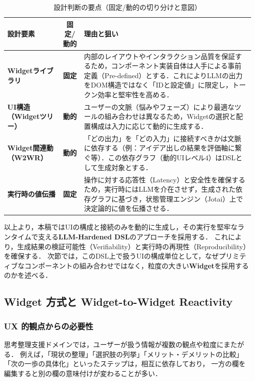 \documentclass[a4paper,10pt]{jarticle}
\begin{document}
\begin{table}[!t]
\caption{設計判断の要点（固定/動的の切り分けと意図）}
\label{tab:design_decision_beta21}
\centering
\small
\begin{tabular}{l|c|p{6.5cm}} \toprule
設計要素 & 固定/動的 & 理由と狙い \\ \midrule
\textbf{Widgetライブラリ} & \textbf{固定} &
内部のレイアウトやインタラクション品質を保証するため，コンポーネント実装自体は人手による事前定義（Pre-defined）とする．これによりLLMの出力をDOM構造ではなく「IDと設定値」に限定し，トークン効率と堅牢性を高める．\\ \hline
\textbf{UI構造（Widgetツリー）} & \textbf{動的} &
ユーザーの文脈（悩みやフェーズ）により最適なツールの組み合わせは異なるため，Widgetの選択と配置構成は入力に応じて動的に生成する．\\ \hline
\textbf{Widget間連動（W2WR）} & \textbf{動的} &
「どの出力」を「どの入力」に接続すべきかは文脈に依存する（例：アイデア出しの結果を評価軸に繋ぐ等）．この依存グラフ（動的UIレベル4）はDSLとして生成対象とする．\\ \hline
\textbf{実行時の値伝播} & \textbf{固定} &
操作に対する応答性（Latency）と安全性を確保するため，実行時にはLLMを介在させず，生成された依存グラフに基づき，状態管理エンジン（Jotai）上で決定論的に値を伝播させる．\\
\bottomrule
\end{tabular}
\end{table}

以上より，本稿ではUIの構成と接続のみを動的に生成し，その実行を堅牢なランタイムで支える\textbf{LLM-Hardened DSL}のアプローチを採用する．
これにより，生成結果の検証可能性（Verifiability）と実行時の再現性（Reproducibility）を確保する．
次節では，このDSL上で扱うUIの構成単位として，なぜプリミティブなコンポーネントの組み合わせではなく，粒度の大きい\textbf{Widget}を採用するのかを述べる．

\subsection{Widget 方式と Widget-to-Widget Reactivity}

\subsubsection{UX 的観点からの必要性}

思考整理支援ドメインでは，ユーザーが扱う情報が複数の観点や粒度にまたがる．
例えば，「現状の整理」「選択肢の列挙」「メリット・デメリットの比較」
「次の一歩の具体化」といったステップは，相互に依存しており，
一方の欄を編集すると別の欄の意味付けが変わることが多い．
\end{document}
